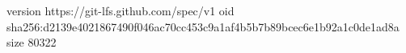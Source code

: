 version https://git-lfs.github.com/spec/v1
oid sha256:d2139e4021867490f046ac70cc453c9a1af4b5b7b89bcec6e1b92a1c0de1ad8a
size 80322
